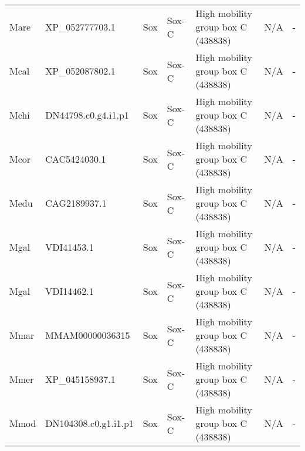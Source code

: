 \documentclass[../main.tex]{subfiles}
\begin{document}
\begin{landscape}
\begin{longtable}{lllllll}
		Mare           & XP\_052777703.1       & Sox            & Sox-C               & High mobility group box C (438838)          & N/A                                                                    & -                    \\
		Mcal           & XP\_052087802.1       & Sox            & Sox-C               & High mobility group box C (438838)          & N/A                                                                    & -                    \\
		Mchi           & DN44798.c0.g4.i1.p1   & Sox            & Sox-C               & High mobility group box C (438838)          & N/A                                                                    & -                    \\
		Mcor           & CAC5424030.1          & Sox            & Sox-C               & High mobility group box C (438838)          & N/A                                                                    & -                    \\
		Medu           & CAG2189937.1          & Sox            & Sox-C               & High mobility group box C (438838)          & N/A                                                                    & -                    \\
		Mgal           & VDI41453.1            & Sox            & Sox-C               & High mobility group box C (438838)          & N/A                                                                    & -                    \\
		Mgal           & VDI14462.1            & Sox            & Sox-C               & High mobility group box C (438838)          & N/A                                                                    & -                    \\
		Mmar           & MMAM00000036315       & Sox            & Sox-C               & High mobility group box C (438838)          & N/A                                                                    & -                    \\
		Mmer           & XP\_045158937.1       & Sox            & Sox-C               & High mobility group box C (438838)          & N/A                                                                    & -                    \\
		Mmod           & DN104308.c0.g1.i1.p1  & Sox            & Sox-C               & High mobility group box C (438838)          & N/A                                                                    & -                    \\

\end{longtable}
\end{landscape}
\end{document}
